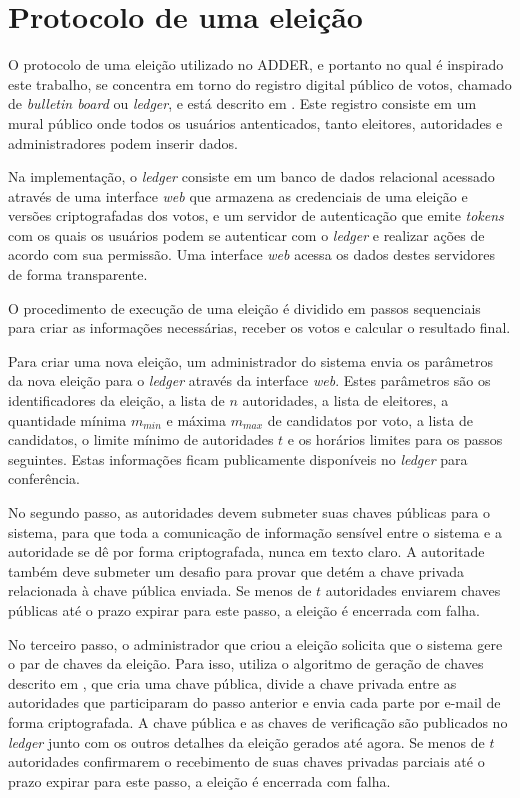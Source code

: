 \section{Protocolo de uma eleição}

O protocolo de uma eleição utilizado no ADDER, e portanto no qual é inspirado
este trabalho, se concentra em torno do registro digital público de votos,
chamado de \textit{bulletin board} ou \textit{ledger}, e está descrito em
\textcite{benaloh1987verifiable}. Este registro consiste em um mural público
onde todos os usuários antenticados, tanto eleitores, autoridades e
administradores podem inserir dados.

Na implementação, o \textit{ledger} consiste em um banco de dados relacional
acessado através de uma interface \textit{web} que armazena as credenciais de
uma eleição e versões criptografadas dos votos, e um servidor de autenticação
que emite \textit{tokens} com os quais os usuários podem se autenticar com o
\textit{ledger} e realizar ações de acordo com sua permissão. Uma interface
\textit{web} acessa os dados destes servidores de forma transparente.

O procedimento de execução de uma eleição é dividido em passos sequenciais para
criar as informações necessárias, receber os votos e calcular o resultado
final.

Para criar uma nova eleição, um administrador do sistema envia os parâmetros da
nova eleição para o \textit{ledger} através da interface \textit{web}. Estes
parâmetros são os identificadores da eleição, a lista de $n$ autoridades, a
lista de eleitores, a quantidade mínima $m_{min}$ e máxima $m_{max}$ de
candidatos por voto, a lista de candidatos, o limite mínimo de autoridades $t$
e os horários limites para os passos seguintes. Estas informações ficam
publicamente disponíveis no \textit{ledger} para conferência.

No segundo passo, as autoridades devem submeter suas chaves públicas para o
sistema, para que toda a comunicação de informação sensível entre o sistema e a
autoridade se dê por forma criptografada, nunca em texto claro. A autoritade
também deve submeter um desafio para provar que detém a chave privada
relacionada à chave pública enviada. Se menos de $t$ autoridades enviarem
chaves públicas até o prazo expirar para este passo, a eleição é encerrada com
falha.

No terceiro passo, o administrador que criou a eleição solicita que o sistema
gere o par de chaves da eleição. Para isso, utiliza o algoritmo de geração de
chaves descrito em \textcite{fouque2000sharing}, que cria uma chave pública,
divide a chave privada entre as autoridades que participaram do passo anterior
e envia cada parte por e-mail de forma criptografada. A chave pública e as
chaves de verificação são publicados no \textit{ledger} junto com os outros
detalhes da eleição gerados até agora. Se menos de $t$ autoridades confirmarem
o recebimento de suas chaves privadas parciais até o prazo expirar para este
passo, a eleição é encerrada com falha.

